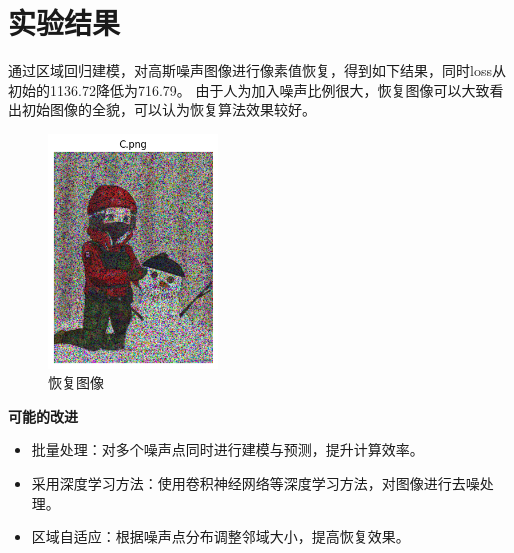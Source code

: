 \documentclass[12pt]{ctexart}
\begin{document}
\section*{实验结果}

通过区域回归建模，对高斯噪声图像进行像素值恢复，得到如下结果，同时loss从初始的1136.72降低为716.79。
由于人为加入噪声比例很大，恢复图像可以大致看出初始图像的全貌，可以认为恢复算法效果较好。

\begin{figure}[H]
    \centering
    \includegraphics[width=0.4\textwidth]{image/5.png}
    \caption{恢复图像}
\end{figure}

\textbf{可能的改进}
\begin{itemize}
    \item 批量处理：对多个噪声点同时进行建模与预测，提升计算效率。
    \item 采用深度学习方法：使用卷积神经网络等深度学习方法，对图像进行去噪处理。
    \item 区域自适应：根据噪声点分布调整邻域大小，提高恢复效果。
\end{itemize}
\end{document}
